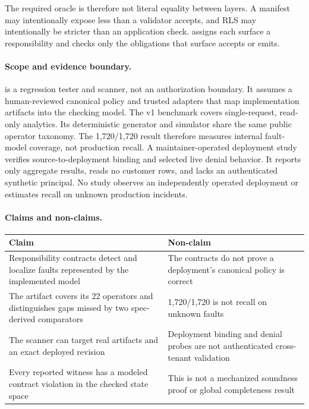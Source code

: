 The required oracle is therefore not literal equality between layers. A manifest may intentionally expose less than a validator accepts, and RLS may intentionally be stricter than an application check. \policystrata{} assigns each surface a responsibility and checks only the obligations that surface accepts or emits.

\paragraph{Scope and evidence boundary.}
\policystrata{} is a regression tester and scanner, not an authorization boundary. It assumes a human-reviewed canonical policy and trusted adapters that map implementation artifacts into the checking model. The v1 benchmark covers single-request, read-only analytics. Its deterministic generator and simulator share the same public operator taxonomy. The 1,720/1,720 result therefore measures internal fault-model coverage, not production recall. A maintainer-operated deployment study verifies source-to-deployment binding and selected live denial behavior. It reports only aggregate results, reads no customer rows, and lacks an authenticated synthetic principal. No study observes an independently operated deployment or estimates recall on unknown production incidents.

\paragraph{Claims and non-claims.}
\begin{center}
\small
\begin{tabular}{@{}L{0.43\columnwidth}L{0.47\columnwidth}@{}}
\toprule
Claim & Non-claim \\
\midrule
Responsibility contracts detect and localize faults represented by the implemented model & The contracts do not prove a deployment's canonical policy is correct \\
The artifact covers its 22 operators and distinguishes gaps missed by two spec-derived comparators & 1,720/1,720 is not recall on unknown faults \\
The scanner can target real artifacts and an exact deployed revision & Deployment binding and denial probes are not authenticated cross-tenant validation \\
Every reported witness has a modeled contract violation in the checked state space & This is not a mechanized soundness proof or global completeness result \\
\bottomrule
\end{tabular}
\end{center}

